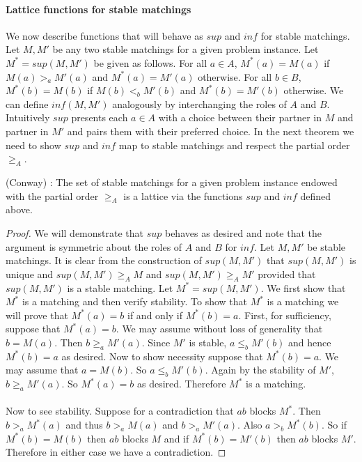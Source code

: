 \paragraph{Lattice functions for stable matchings} We now describe functions that will behave as $sup$ and $inf$ for stable matchings. Let $M, M'$ be any two stable matchings for a given problem instance. Let $M^* = sup(M,M')$ be given as follows. For all $a \in A$, $M^*(a) = M(a)$ if $M(a) >_a M'(a)$ and $M^*(a) = M'(a)$ otherwise. For all $b \in B$, $M^*(b) = M(b)$ if $M(b) <_b M'(b)$ and $M^*(b) = M'(b)$ otherwise. We can define $inf(M,M')$ analogously by interchanging the roles of $A$ and $B$. Intuitively $sup$  presents each $a \in A$ with a choice between their partner in $M$ and partner in $M'$ and pairs them with their preferred choice. In the next theorem we need to show $sup$ and $inf$ map to stable matchings and respect the partial order $\geq_A$.
\begin{theorem}(Conway)\label{theorem:lattice} \cite{knuthmariages}: The set of stable matchings for a given problem instance endowed with the partial order $\geq_A$ is a lattice via the functions $sup$ and $inf$ defined above.
\end{theorem}
\begin{proof}
We will demonstrate that $sup$ behaves as desired and note that the argument is symmetric about the roles of $A$ and $B$ for $inf$. Let $M, M'$ be stable matchings. It is clear from the construction of $sup(M,M')$ that  $sup(M,M')$ is unique and $sup(M,M') \geq_A M$ and $sup(M,M') \geq_A M'$ provided that $sup(M,M')$ is a stable matching. Let $M^* = sup(M,M')$. We first show that $M^*$ is a matching and then verify stability. To show that $M^*$ is a matching we will prove that $M^*(a) = b$ if and only if $M^*(b) = a$. First, for sufficiency, suppose that $M^*(a) = b$.  We may assume without loss of generality that $b = M(a)$. Then $b \geq_a M'(a)$. Since $M'$ is stable, $a \leq_b M'(b)$ and hence $M^*(b) = a$ as desired. Now to show necessity suppose that $M^*(b) = a$. We may assume that $a = M(b)$. So $a \leq_b M'(b)$. Again by the stability of $M'$, $b \geq_a M'(a)$. So $M^*(a) = b$ as desired. Therefore $M^*$ is a matching. 
\paragraph{}
Now to see stability. Suppose for a contradiction that $ab$ blocks $M^*$. Then $b >_a M^*(a)$ and thus $b>_a M(a)$ and $b >_a M'(a)$. Also $a >_b M^*(b)$. So if $M^*(b) = M(b)$ then $ab$ blocks $M$ and if $M^*(b) = M'(b)$ then $ab$ blocks $M'$. Therefore in either case we have  a contradiction. \end{proof}
